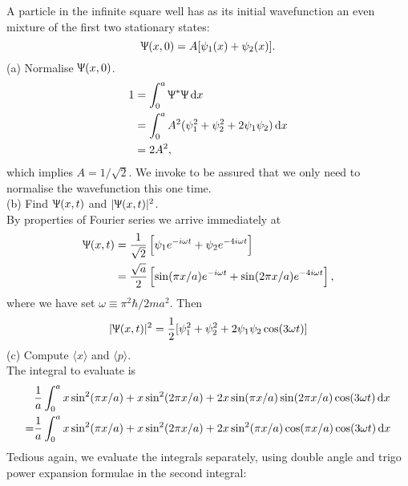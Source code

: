 \begin{wex}
A particle in the infinite square well has as its initial wavefunction an even mixture of the first two stationary states:
\begin{equation}
\Uppsi(x,0)=A[\psi_1(x)+\psi_2(x)].
\end{equation}
(a) Normalise $\Uppsi(x,0)$.
\ \\
\begin{subequations}
\begin{align}
1&=\int^a_0\ups^*\ups\dx\\
&=\int^a_0 A^2(\psi_1^2+\psi_2^2+2\psi_1\psi_2)\dx\\
&=2A^2, 
\end{align}
\end{subequations}
which implies $A=1/\sqrt{2}$. We invoke  to be assured that we only need to normalise the wavefunction this one time. \\
(b) Find $\Uppsi(x,t)$ and $|\Uppsi(x,t)|^2$. \\
By properties of Fourier series we arrive immediately at 
\begin{equation}
\begin{aligned}
\Uppsi(x,t)&=\frac{1}{\sqrt{2}}\left[\psi_1e^{-i\omega t}+\psi_2e^{-4i\omega t}\right]\\
&=\frac{\sqrt{a}}{2}\left[\sin(\pi x/a)e^{-i\omega t} +\sin(2\pi x/a)e^{-4i\omega t}\right],
\end{aligned}
\end{equation}
where we have set $\omega\equiv\pi^2\hbar/2ma^2$. Then
\begin{equation}
|\Uppsi(x,t)|^2=\frac{1}{2}[\psi_1^2+\psi_2^2+2\psi_1\psi_2\cos(3\omega t)]
\end{equation}
(c) Compute $\langle x\rangle$ and $\langle p\rangle$. \\
The integral to evaluate is 
\begin{equation}
\begin{aligned}
&\frac{1}{a}\int^a_0 x\sin^2(\pi x/a)+x\sin^2(2\pi x/a)+2x\sin(\pi x/a)\sin(2\pi x/a)\cos(3\omega t)\dx\\
=&\frac{1}{a}\int^a_0 x\sin^2(\pi x/a)+x\sin^2(2\pi x/a)+2x\sin^2(\pi x/a)\cos(\pi x/a)\cos(3\omega t)\dx
\end{aligned}
\end{equation}
Tedious again, we evaluate the integrals separately, using double angle and trigo power expansion formulae in the second integral: 
\begin{subequations}
\begin{align}

\end{align}
\end{subequations}
\end{wex}
